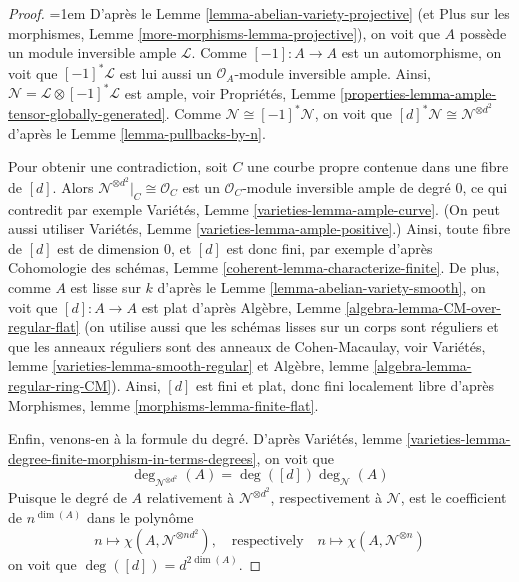\begin{proof}
{\emergencystretch=1em D'après le Lemme \ref{lemma-abelian-variety-projective}
(et Plus sur les morphismes, Lemme \ref{more-morphisms-lemma-projective}),
on voit que $A$ possède un module inversible ample $\mathcal{L}$.
Comme $[-1] : A \to A$ est un automorphisme, on voit que
$[-1]^*\mathcal{L}$ est lui aussi un $\mathcal{O}_A$-module inversible ample.
Ainsi, $\mathcal{N} = \mathcal{L} \otimes [-1]^*\mathcal{L}$
est ample, voir
Propriétés, Lemme \ref{properties-lemma-ample-tensor-globally-generated}.
Comme $\mathcal{N} \cong [-1]^*\mathcal{N}$, on voit que
$[d]^*\mathcal{N} \cong \mathcal{N}^{\otimes d^2}$ d'après le
Lemme \ref{lemma-pullbacks-by-n}.\par}

\medskip\noindent
Pour obtenir une contradiction, soit $C$ une courbe propre contenue dans une
fibre de $[d]$. Alors $\mathcal{N}^{\otimes d^2}|_C \cong \mathcal{O}_C$
est un $\mathcal{O}_C$-module inversible ample de degré $0$, ce qui
contredit par exemple Variétés, Lemme \ref{varieties-lemma-ample-curve}.
(On peut aussi utiliser Variétés, Lemme \ref{varieties-lemma-ample-positive}.)
Ainsi, toute fibre de $[d]$ est de dimension $0$, et $[d]$ est donc fini,
par exemple d'après Cohomologie des schémas, Lemme
\ref{coherent-lemma-characterize-finite}.
De plus, comme $A$ est lisse sur $k$ d'après le
Lemme \ref{lemma-abelian-variety-smooth},
on voit que $[d] : A \to A$ est plat d'après
Algèbre, Lemme \ref{algebra-lemma-CM-over-regular-flat}
(on utilise aussi que les schémas lisses sur un corps sont réguliers et que
les anneaux réguliers sont des anneaux de Cohen-Macaulay, voir
Variétés, lemme \ref{varieties-lemma-smooth-regular} et
Algèbre, lemme \ref{algebra-lemma-regular-ring-CM}).
Ainsi, $[d]$ est fini et plat, donc fini localement libre d'après
Morphismes, lemme \ref{morphisms-lemma-finite-flat}.

\medskip\noindent
Enfin, venons-en à la formule du degré. D'après
Variétés, lemme \ref{varieties-lemma-degree-finite-morphism-in-terms-degrees},
on voit que
$$
\deg_{\mathcal{N}^{\otimes d^2}}(A) = \deg([d]) \deg_\mathcal{N}(A)
$$
Puisque le degré de $A$ relativement à
$\mathcal{N}^{\otimes d^2}$, respectivement à $\mathcal{N}$,
est le coefficient de $n^{\dim(A)}$ dans le polynôme
$$
n \longmapsto \chi(A, \mathcal{N}^{\otimes nd^2}),\quad
\text{respectively}\quad n \longmapsto \chi(A, \mathcal{N}^{\otimes n})
$$
on voit que $\deg([d]) = d^{2 \dim(A)}$.
\end{proof}

